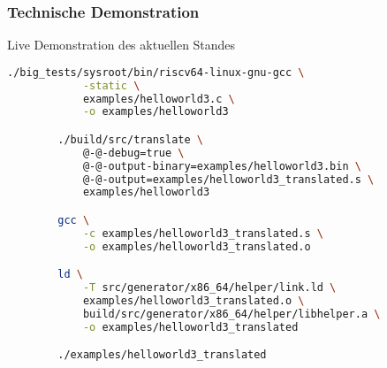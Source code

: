 \begin{frame}[fragile]
    \frametitle{Technische Demonstration}{Live Demonstration des aktuellen Standes}



    \begin{lstlisting}[language=bash, basicstyle=\footnotesize\ttfamily, extendedchars=true,escapeinside={@@}]
        ./big_tests/sysroot/bin/riscv64-linux-gnu-gcc \
            -static \
            examples/helloworld3.c \
            -o examples/helloworld3

        ./build/src/translate \
            @-@-debug=true \
            @-@-output-binary=examples/helloworld3.bin \
            @-@-output=examples/helloworld3_translated.s \
            examples/helloworld3

        gcc \
            -c examples/helloworld3_translated.s \
            -o examples/helloworld3_translated.o

        ld \
            -T src/generator/x86_64/helper/link.ld \
            examples/helloworld3_translated.o \
            build/src/generator/x86_64/helper/libhelper.a \
            -o examples/helloworld3_translated

        ./examples/helloworld3_translated
    \end{lstlisting}
\end{frame}
\clearpage


